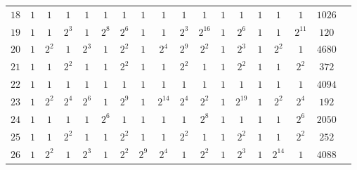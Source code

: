 \begin{table}
\begin{center}
\begin{adjustbox}{max width=\textwidth}
\begin{tabular}{|c|cccccccccccccccc|c|}
$18$ &$1$ &$1$ &$1$ &$1$ &$1$ &$1$ &$1$ &$1$ &$1$ &$1$ &$1$ &$1$ &$1$ &$1$ &$1$ &$1026$ \\
$19$ &$1$ &$1$ &$2^3$ &$1$ &$2^8$ &$2^6$ &$1$ &$1$ &$2^3$ &$2^{16}$ &$1$ &$2^6$ &$1$ &$1$ &$2^{11}$ &$120$ \\
$20$ &$1$ &$2^2$ &$1$ &$2^3$ &$1$ &$2^2$ &$1$ &$2^4$ &$2^9$ &$2^2$ &$1$ &$2^3$ &$1$ &$2^2$ &$1$ &$4680$ \\
$21$ &$1$ &$1$ &$2^2$ &$1$ &$1$ &$2^2$ &$1$ &$1$ &$2^2$ &$1$ &$1$ &$2^2$ &$1$ &$1$ &$2^2$ &$372$ \\
$22$ &$1$ &$1$ &$1$ &$1$ &$1$ &$1$ &$1$ &$1$ &$1$ &$1$ &$1$ &$1$ &$1$ &$1$ &$1$ &$4094$ \\
$23$ &$1$ &$2^2$ &$2^4$ &$2^6$ &$1$ &$2^9$ &$1$ &$2^{14}$ &$2^4$ &$2^2$ &$1$ &$2^{19}$ &$1$ &$2^2$ &$2^4$ &$192$ \\
$24$ &$1$ &$1$ &$1$ &$1$ &$2^6$ &$1$ &$1$ &$1$ &$1$ &$2^8$ &$1$ &$1$ &$1$ &$1$ &$2^6$ &$2050$ \\
$25$ &$1$ &$1$ &$2^2$ &$1$ &$1$ &$2^2$ &$1$ &$1$ &$2^2$ &$1$ &$1$ &$2^2$ &$1$ &$1$ &$2^2$ &$252$ \\
$26$ &$1$ &$2^2$ &$1$ &$2^3$ &$1$ &$2^2$ &$2^9$ &$2^4$ &$1$ &$2^2$ &$1$ &$2^3$ &$1$ &$2^{14}$ &$1$ &$4088$ \\

\end{tabular}
\end{adjustbox}
\end{center}
\end{table}
